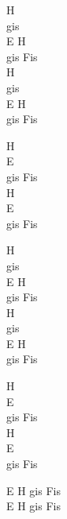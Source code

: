 \begin{chord}
    H\\
    gis\\
    E H\\
    gis Fis\\
    H\\
    gis\\
    E H\\
    gis Fis 

    H\\
    E\\
    gis Fis\\
    H\\
    E\\
    gis Fis

    H\\
    gis\\
    E H\\
    gis Fis \\
    H\\
    gis\\
    E H\\
    gis Fis 

    H\\
    E\\
    gis Fis\\
    H\\
    E\\
    gis Fis

    E H gis Fis\\
    E H gis Fis

\end{chord}